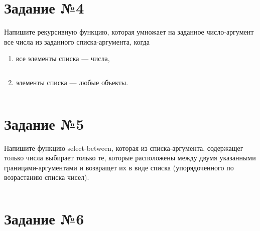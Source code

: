 \section{Задание №4}

Напишите рекурсивную функцию, которая умножает на заданное
число-аргумент все числа из заданного списка-аргумента, когда 

\begin{enumerate}
    \item все элементы списка --- числа,

\vspace{4mm}
\begin{minipage}{0.92\linewidth}
\begin{lstlisting}
\end{lstlisting}
\end{minipage}

    \item элементы списка --- любые объекты.

\vspace{4mm}
\begin{minipage}{0.92\linewidth}
\begin{lstlisting}
\end{lstlisting}
\end{minipage}

\end{enumerate}

\section{Задание №5}

Напишите функцию select-between, которая из списка-аргумента, содержащег
только числа
выбирает только те, которые расположены между двумя указанными
границами-аргументами и возвращет их в виде списка (упорядоченного по
возрастанию списка чисел).

\vspace{4mm}
\begin{minipage}{0.92\linewidth}
\begin{lstlisting}
\end{lstlisting}
\end{minipage}

\section{Задание №6}

